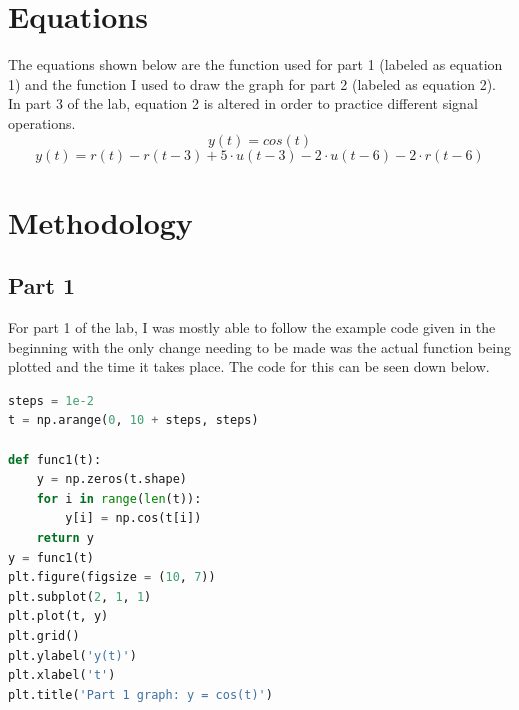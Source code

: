 \documentclass[12pt]{report}
\begin{document}
\section{Equations}
The equations shown below are the function used for part 1 (labeled as equation 1) 
and the function I used to draw the graph for part 2 (labeled as equation 2).
In part 3 of the lab, equation 2 is altered in order to practice different
signal operations.
\begin{equation}
y(t) = cos(t)
\end{equation}
\begin{equation}
y(t) = r(t) - r(t-3) + 5 \cdot u(t-3) - 2 \cdot u(t-6) - 2 \cdot r(t-6)
\end{equation}
\section{Methodology}
\subsection{Part 1}
For part 1 of the lab, I was mostly able to follow the example code given in the beginning with the only change needing to be made was the actual function being plotted and the time it takes place. The code for this can be seen down below.

\begin{lstlisting}[language=Python]
steps = 1e-2
t = np.arange(0, 10 + steps, steps)

def func1(t):
    y = np.zeros(t.shape)
    for i in range(len(t)):
        y[i] = np.cos(t[i])
    return y
y = func1(t)
plt.figure(figsize = (10, 7))
plt.subplot(2, 1, 1)
plt.plot(t, y)
plt.grid()
plt.ylabel('y(t)')
plt.xlabel('t')
plt.title('Part 1 graph: y = cos(t)')
\end{lstlisting}
\end{document}
